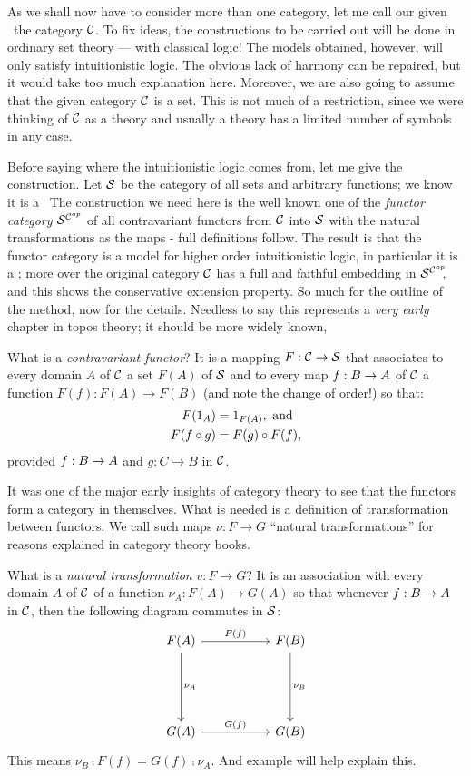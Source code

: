 As we shall now have to consider more than one category, let me call our given \ccc\ the category $\C$. To fix ideas, the constructions to be carried out will be done in ordinary set theory --- with classical logic! The models obtained, however, will only satisfy intuitionistic logic. The obvious lack of harmony can be repaired, but it would take too much explanation here. Moreover, we are also going to assume that the given category $\C$ is a set. This is not much of a restriction, since we were thinking of $\C$ as a theory and usually a theory has a limited number of symbols in any case.

Before saying where the intuitionistic logic comes from, let me give the construction. Let $\S$ be the category of all sets and arbitrary functions; we know it is a \ccc\  The construction we need here is the well known one of the {\it functor category} $\scop$ of all contravariant functors from $\C$ into $\S$ with the natural transformations as the maps - full definitions follow. The result is that the functor category is a model for higher order intuitionistic logic, in particular it is a \ccc; more over the original category $\C$ has a full and faithful embedding in $\scop\!\!$, and this shows the conservative extension property. So much for the outline of the method, now for the details. Needless to say this represents a {\it very early} chapter in topos theory; it should be more widely known,

What is a {\it contravariant functor}? It is a mapping $F: \C\to \S$ that associates to every domain $A$ of $\C$ a set $F(A)$ of $\S$ and to every map $f: \BA$ of $\C$ a function $F(f) : F(A) \to F(B)$ (and note the change of order!) so that:
\begin{align*}
F(\id_A) &= \id_{F(A)} , {\textrm{ and}}\\
F(f \comp g) &= F(g) \comp F(f),
\end{align*}
%
provided $f: \BA$ and $g: C \to B$ in $\C$.

It was one of the major early insights of category theory to see that the functors form
a category in themselves. What is needed is a definition of transformation between functors. We call such maps $\nu : F \to G$ ``natural transformations'' for reasons explained in category theory books.

What is a {\it natural transformation} $v : F\to G$? It is an association with every domain $A$ of $\C$ of a function $\nu_A: F(A)\to G(A)$ so that whenever $f : \BA$ in $\C$, then the following diagram commutes in $\S$:
\[
\begin{tikzcd}[row sep=.75in, column sep = .75in]
    F(A) \arrow{d}{\nu_A} \arrow{r}{F(f)}  & F(B) \arrow{d}{\nu_B} \\
    G(A)  \arrow{r}{G(f)} & G(B)
\end{tikzcd}
\]
This means $\nu_B \comp F(f) = G(f) \comp \nu_A$. And example will help explain this.

